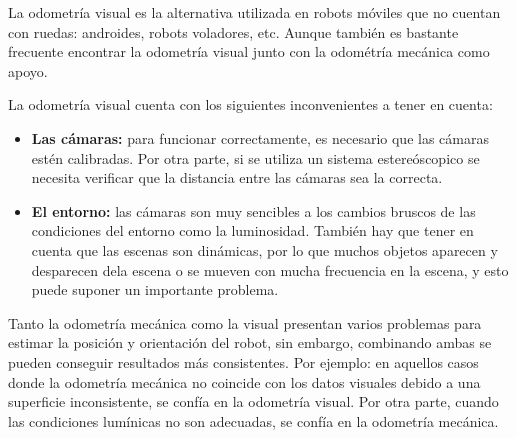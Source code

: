 La odometría visual es la alternativa utilizada en robots móviles que no cuentan
con ruedas: androides, robots voladores, etc. Aunque también es bastante
frecuente encontrar la odometría visual junto con la odométría mecánica como
apoyo.

La odometría visual cuenta con los siguientes inconvenientes a tener en cuenta:

\begin{itemize}
  \item \textbf{Las cámaras:} para funcionar correctamente, es necesario que las
  cámaras estén calibradas. Por otra parte, si se utiliza un sistema
  estereóscopico se necesita verificar que la distancia entre las cámaras sea la
  correcta.
  \item \textbf{El entorno:} las cámaras son muy sencibles a los cambios bruscos
  de las condiciones del entorno como la luminosidad. También hay que tener en
  cuenta que las escenas son dinámicas, por lo que muchos objetos aparecen y
  desparecen dela escena o se mueven con mucha frecuencia en la escena, y esto
  puede suponer un importante problema.
\end{itemize}
    
Tanto la odometría mecánica como la visual presentan varios problemas para
estimar la posición y orientación del robot, sin embargo, combinando ambas se
pueden conseguir resultados más consistentes. Por ejemplo: en aquellos casos
donde la odometría mecánica no coincide con los datos visuales debido a una
superficie inconsistente, se confía en la odometría visual. Por otra parte,
cuando las condiciones lumínicas no son adecuadas, se confía en la odometría
mecánica.

